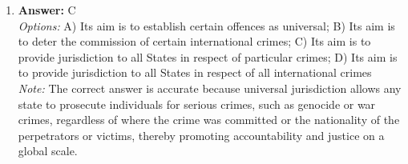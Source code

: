 \documentclass[12pt]{article}
\begin{document}
\begin{enumerate}[label=\arabic*.]
\\ \textit{Options:} A) Sovereignty means being recognised by all other States; B) Sovereignty means to be able to enter into treaties and join the UN; C) Sovereignty means freedom to determine one's own affairs without external interference; D) Sovereignty means possessing the right to defend oneself
\\ \textit{Note:} The correct answer captures the essence of sovereignty, which is the inherent authority of a state to govern itself and make decisions independently, free from outside control or influence.
\item \textbf{Answer:} C
\\ \textit{Options:} A) Its aim is to establish certain offences as universal; B) Its aim is to deter the commission of certain international crimes; C) Its aim is to provide jurisdiction to all States in respect of particular crimes; D) Its aim is to provide jurisdiction to all States in respect of all international crimes
\\ \textit{Note:} The correct answer is accurate because universal jurisdiction allows any state to prosecute individuals for serious crimes, such as genocide or war crimes, regardless of where the crime was committed or the nationality of the perpetrators or victims, thereby promoting accountability and justice on a global scale.
\end{enumerate}
\end{document}
